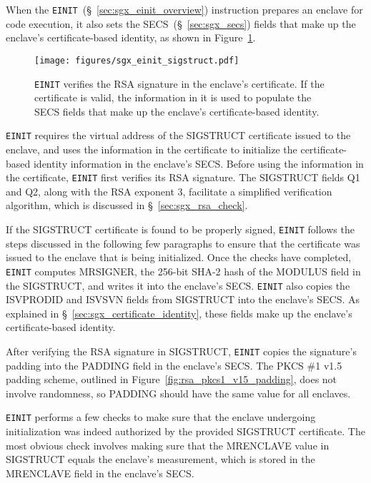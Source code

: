 \label{sec:sgx_einit_sigstruct}

When the \texttt{EINIT}~(\S~\ref{sec:sgx_einit_overview}) instruction prepares
an enclave for code execution, it also sets the SECS~(\S~\ref{sec:sgx_secs})
fields that make up the enclave's certificate-based identity, as shown in
Figure~\ref{fig:sgx_einit_sigstruct}.

\begin{figure}[hbt]
  \centering
  \texttt{[image: figures/sgx\_einit\_sigstruct.pdf]}
  \caption{
    \texttt{EINIT} verifies the RSA signature in the enclave's certificate. If
    the certificate is valid, the information in it is used to populate the
    SECS fields that make up the enclave's certificate-based identity.
  }
  \label{fig:sgx_einit_sigstruct}
\end{figure}


\texttt{EINIT} requires the virtual address of the SIGSTRUCT certificate
issued to the enclave, and uses the information in the certificate to
initialize the certificate-based identity information in the enclave's SECS.
Before using the information in the certificate, \texttt{EINIT} first verifies
its RSA signature. The SIGSTRUCT fields Q1 and Q2, along with the RSA exponent
3, facilitate a simplified verification algorithm, which is discussed in
\S~\ref{sec:sgx_rsa_check}.

If the SIGSTRUCT certificate is found to be properly signed, \texttt{EINIT}
follows the steps discussed in the following few paragraphs to ensure that the
certificate was issued to the enclave that is being initialized. Once the
checks have completed, \texttt{EINIT} computes MRSIGNER, the 256-bit SHA-2 hash
of the MODULUS field in the SIGSTRUCT, and writes it into the enclave's SECS.
\texttt{EINIT} also copies the ISVPRODID and ISVSVN fields from SIGSTRUCT into
the enclave's SECS. As explained in \S~\ref{sec:sgx_certificate_identity},
these fields make up the enclave's certificate-based identity.

After verifying the RSA signature in SIGSTRUCT, \texttt{EINIT} copies the
signature's padding into the PADDING field in the enclave's SECS. The PKCS \#1
v1.5 padding scheme, outlined in Figure~\ref{fig:rsa_pkcs1_v15_padding}, does
not involve randomness, so PADDING should have the same value for all enclaves.

\texttt{EINIT} performs a few checks to make sure that the enclave undergoing
initialization was indeed authorized by the provided SIGSTRUCT certificate. The
most obvious check involves making sure that the MRENCLAVE value in SIGSTRUCT
equals the enclave's measurement, which is stored in the MRENCLAVE field in
the enclave's SECS.

